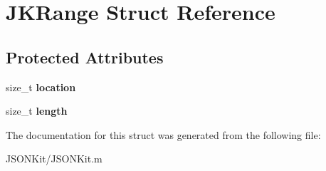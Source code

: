 \hypertarget{struct_j_k_range}{\section{J\+K\+Range Struct Reference}
\label{struct_j_k_range}
}
\subsection*{Protected Attributes}
\begin{DoxyCompactItemize}
\item 
\hypertarget{struct_j_k_range_aef1c09bd06b578b2f7dac97529e061c8}{size\+\_\+t {\bfseries location}}\label{struct_j_k_range_aef1c09bd06b578b2f7dac97529e061c8}

\item 
\hypertarget{struct_j_k_range_ae6422b6a24aeb2f4c9834ca5543bf1b9}{size\+\_\+t {\bfseries length}}\label{struct_j_k_range_ae6422b6a24aeb2f4c9834ca5543bf1b9}

\end{DoxyCompactItemize}


The documentation for this struct was generated from the following file\+:\begin{DoxyCompactItemize}
\item 
J\+S\+O\+N\+Kit/J\+S\+O\+N\+Kit.\+m\end{DoxyCompactItemize}
